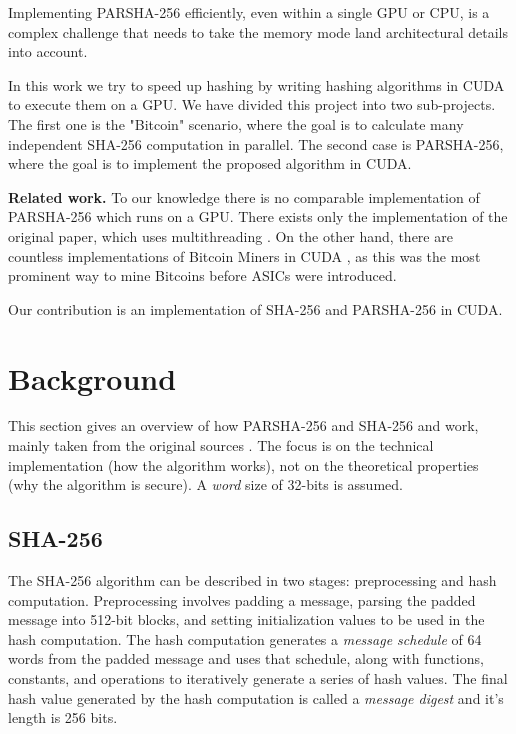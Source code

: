 \documentclass[letterpaper]{article}
\newcommand{\mypar}[1]{{\bf #1.}}
\begin{document}
Implementing PARSHA-256 efficiently,  even  within  a  single GPU or CPU, is a complex challenge that needs to take the memory mode land architectural details into account.

In this work we try to speed up hashing by writing hashing algorithms in CUDA \cite{cuda} to execute them on a GPU. We have divided this project into two sub-projects. The first one is the "Bitcoin" scenario, where the goal is to calculate many independent SHA-256 computation in parallel. The second case is PARSHA-256, where the goal is to implement the proposed algorithm in CUDA. 

\mypar{Related work} To our knowledge there is no comparable implementation of PARSHA-256 which runs on a GPU. There exists only the implementation of the original paper, which uses multithreading \cite{parsha256}. 
On the other hand, there are countless implementations of Bitcoin Miners in CUDA \cite{cbuchner,geedo}, as this was the most prominent way to mine Bitcoins before ASICs were introduced. 

Our contribution is an implementation of SHA-256 and PARSHA-256 in CUDA.

\section{Background}\label{sec:background}

This section gives an overview of how PARSHA-256 and SHA-256 and work, mainly taken from the original sources \cite{sha,parsha256}. The focus is on the technical implementation (how the algorithm works), not on the theoretical properties (why the algorithm is secure). A \emph{word} size of 32-bits is assumed.

\subsection{SHA-256 \cite{sha}}

The SHA-256 algorithm can be described in two stages: preprocessing and hash computation.  Preprocessing involves padding a message, parsing the padded message into 512-bit blocks, and setting initialization values to be used in the hash computation.  The hash computation generates a \emph{message schedule} of 64 words from the padded message and uses that schedule, along with functions, constants, and operations to iteratively generate a series of hash values.  The final hash value generated by the hash computation is called a \emph{message digest} and it's length is 256 bits.\\
\end{document}
